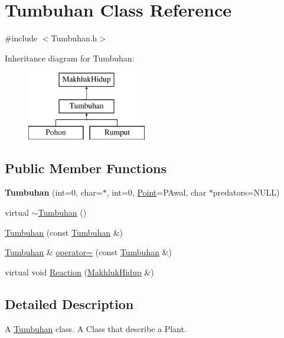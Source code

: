 \hypertarget{class_tumbuhan}{}\section{Tumbuhan Class Reference}
\label{class_tumbuhan}


{\ttfamily \#include $<$Tumbuhan.\+h$>$}

Inheritance diagram for Tumbuhan\+:\begin{figure}[H]
\begin{center}
\leavevmode
\includegraphics[height=3.000000cm]{class_tumbuhan}
\end{center}
\end{figure}
\subsection*{Public Member Functions}
\begin{DoxyCompactItemize}
\item 
{\bfseries Tumbuhan} (int=0, char=\textquotesingle{}$\ast$\textquotesingle{}, int=0, \hyperlink{class_point}{Point}=P\+Awal, char $\ast$predators=N\+U\+LL)\hypertarget{class_tumbuhan_aece859d46878b8a73ac6d9fd289be394}{}\label{class_tumbuhan_aece859d46878b8a73ac6d9fd289be394}

\item 
virtual \hyperlink{class_tumbuhan_a2a100d72f16d993c8ee8f60dedecde9f}{$\sim$\+Tumbuhan} ()
\item 
\hyperlink{class_tumbuhan_a1bbb9c53833295124b77b21b10f2381f}{Tumbuhan} (const \hyperlink{class_tumbuhan}{Tumbuhan} \&)
\item 
\hyperlink{class_tumbuhan}{Tumbuhan} \& \hyperlink{class_tumbuhan_afc48425284c108828af78310674ebf4b}{operator=} (const \hyperlink{class_tumbuhan}{Tumbuhan} \&)
\item 
virtual void \hyperlink{class_tumbuhan_aa4cdb9c1bf7aebe6f35a9292b4d527e1}{Reaction} (\hyperlink{class_makhluk_hidup}{Makhluk\+Hidup} \&)
\end{DoxyCompactItemize}


\subsection{Detailed Description}
A \hyperlink{class_tumbuhan}{Tumbuhan} class. A Class that describe a Plant. 

